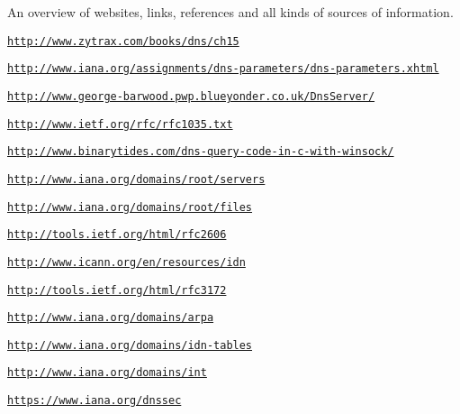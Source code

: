 An overview of websites, links, references and all kinds of sources of information.


\begin{DoxyItemize}
\item \href{http://www.zytrax.com/books/dns/ch15}{\tt http\-://www.\-zytrax.\-com/books/dns/ch15}
\item \href{http://www.iana.org/assignments/dns-parameters/dns-parameters.xhtml}{\tt http\-://www.\-iana.\-org/assignments/dns-\/parameters/dns-\/parameters.\-xhtml}
\item \href{http://www.george-barwood.pwp.blueyonder.co.uk/DnsServer/}{\tt http\-://www.\-george-\/barwood.\-pwp.\-blueyonder.\-co.\-uk/\-Dns\-Server/}
\item \href{http://www.ietf.org/rfc/rfc1035.txt}{\tt http\-://www.\-ietf.\-org/rfc/rfc1035.\-txt}
\item \href{http://www.binarytides.com/dns-query-code-in-c-with-winsock/}{\tt http\-://www.\-binarytides.\-com/dns-\/query-\/code-\/in-\/c-\/with-\/winsock/}
\item \href{http://www.iana.org/domains/root/servers}{\tt http\-://www.\-iana.\-org/domains/root/servers}
\item \href{http://www.iana.org/domains/root/files}{\tt http\-://www.\-iana.\-org/domains/root/files}
\item \href{http://tools.ietf.org/html/rfc2606}{\tt http\-://tools.\-ietf.\-org/html/rfc2606}
\item \href{http://www.icann.org/en/resources/idn}{\tt http\-://www.\-icann.\-org/en/resources/idn}
\item \href{http://tools.ietf.org/html/rfc3172}{\tt http\-://tools.\-ietf.\-org/html/rfc3172}
\item \href{http://www.iana.org/domains/arpa}{\tt http\-://www.\-iana.\-org/domains/arpa}
\item \href{http://www.iana.org/domains/idn-tables}{\tt http\-://www.\-iana.\-org/domains/idn-\/tables}
\item \href{http://www.iana.org/domains/int}{\tt http\-://www.\-iana.\-org/domains/int}
\item \href{https://www.iana.org/dnssec}{\tt https\-://www.\-iana.\-org/dnssec} 
\end{DoxyItemize}